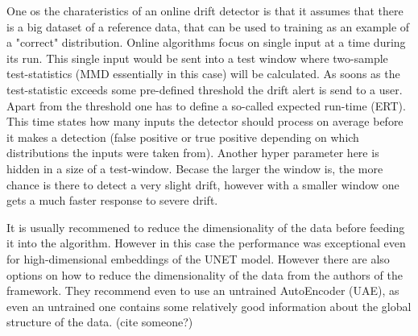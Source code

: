 One os the charateristics of an online drift detector is that it assumes that there is a big dataset of a reference data, that can be used to training as an example of a "correct" distribution. Online algorithms focus on single input at a time during its run. This single input would be sent into a test window where two-sample test-statistics (MMD essentially in this case) will be calculated. As soons as the test-statistic exceeds some pre-defined threshold the drift alert is send to a user. Apart from the threshold one has to define a so-called expected run-time (ERT). This time states how many inputs the detector should process on average before it makes a detection (false positive or true positive depending on which distributions the inputs were taken from). Another hyper parameter here is hidden in a size of a test-window. Becase the larger the window is, the more chance is there to detect a very slight drift, however with a smaller window one gets a much faster response to severe drift. 

It is usually recommened to reduce the dimensionality of the data before feeding it into the algorithm. However in this case the performance was exceptional even for high-dimensional embeddings of the UNET model. However there are also options on how to reduce the dimensionality of the data from the authors of the framework. They recommend even to use an untrained AutoEncoder (UAE), as even an untrained one contains some relatively good information about the global structure of the data. (cite someone?)